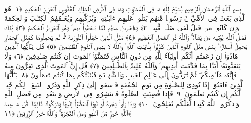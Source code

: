 
  
    
  
    
    

\nopagebreak
  بِسمِ ٱللَّهِ ٱلرَّحمَـٰنِ ٱلرَّحِيمِ
  يُسَبِّحُ لِلَّهِ مَا فِى ٱلسَّمَـٰوَٟتِ وَمَا فِى ٱلأَرضِ ٱلمَلِكِ ٱلقُدُّوسِ ٱلعَزِيزِ ٱلحَكِيمِ ﴿١﴾
 هُوَ ٱلَّذِى بَعَثَ فِى ٱلأُمِّيِّۦنَ رَسُولًۭا مِّنهُم يَتلُوا۟ عَلَيهِم ءَايَـٰتِهِۦ وَيُزَكِّيهِم وَيُعَلِّمُهُمُ ٱلكِتَـٰبَ وَٱلحِكمَةَ وَإِن كَانُوا۟ مِن قَبلُ لَفِى ضَلَـٰلٍۢ مُّبِينٍۢ ﴿٢﴾
 وَءَاخَرِينَ مِنهُم لَمَّا يَلحَقُوا۟ بِهِم ۚ وَهُوَ ٱلعَزِيزُ ٱلحَكِيمُ ﴿٣﴾
 ذَٟلِكَ فَضلُ ٱللَّهِ يُؤتِيهِ مَن يَشَآءُ ۚ وَٱللَّهُ ذُو ٱلفَضلِ ٱلعَظِيمِ ﴿٤﴾
 مَثَلُ ٱلَّذِينَ حُمِّلُوا۟ ٱلتَّورَىٰةَ ثُمَّ لَم يَحمِلُوهَا كَمَثَلِ ٱلحِمَارِ يَحمِلُ أَسفَارًۢا ۚ بِئسَ مَثَلُ ٱلقَومِ ٱلَّذِينَ كَذَّبُوا۟ بِـَٔايَـٰتِ ٱللَّهِ ۚ وَٱللَّهُ لَا يَهدِى ٱلقَومَ ٱلظَّـٰلِمِينَ ﴿٥﴾
 قُل يَـٰٓأَيُّهَا ٱلَّذِينَ هَادُوٓا۟ إِن زَعَمتُم أَنَّكُم أَولِيَآءُ لِلَّهِ مِن دُونِ ٱلنَّاسِ فَتَمَنَّوُا۟ ٱلمَوتَ إِن كُنتُم صَـٰدِقِينَ ﴿٦﴾
 وَلَا يَتَمَنَّونَهُۥٓ أَبَدًۢا بِمَا قَدَّمَت أَيدِيهِم ۚ وَٱللَّهُ عَلِيمٌۢ بِٱلظَّـٰلِمِينَ ﴿٧﴾
 قُل إِنَّ ٱلمَوتَ ٱلَّذِى تَفِرُّونَ مِنهُ فَإِنَّهُۥ مُلَـٰقِيكُم ۖ ثُمَّ تُرَدُّونَ إِلَىٰ عَـٰلِمِ ٱلغَيبِ وَٱلشَّهَـٰدَةِ فَيُنَبِّئُكُم بِمَا كُنتُم تَعمَلُونَ ﴿٨﴾
 يَـٰٓأَيُّهَا ٱلَّذِينَ ءَامَنُوٓا۟ إِذَا نُودِىَ لِلصَّلَوٰةِ مِن يَومِ ٱلجُمُعَةِ فَٱسعَوا۟ إِلَىٰ ذِكرِ ٱللَّهِ وَذَرُوا۟ ٱلبَيعَ ۚ ذَٟلِكُم خَيرٌۭ لَّكُم إِن كُنتُم تَعلَمُونَ ﴿٩﴾
 فَإِذَا قُضِيَتِ ٱلصَّلَوٰةُ فَٱنتَشِرُوا۟ فِى ٱلأَرضِ وَٱبتَغُوا۟ مِن فَضلِ ٱللَّهِ وَٱذكُرُوا۟ ٱللَّهَ كَثِيرًۭا لَّعَلَّكُم تُفلِحُونَ ﴿١٠﴾
 وَإِذَا رَأَوا۟ تِجَٰرَةً أَو لَهوًا ٱنفَضُّوٓا۟ إِلَيهَا وَتَرَكُوكَ قَآئِمًۭا ۚ قُل مَا عِندَ ٱللَّهِ خَيرٌۭ مِّنَ ٱللَّهوِ وَمِنَ ٱلتِّجَٰرَةِ ۚ وَٱللَّهُ خَيرُ ٱلرَّٟزِقِينَ ﴿١١﴾
 
